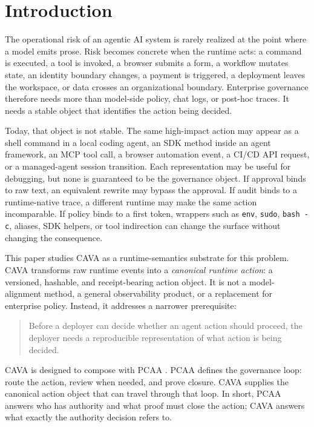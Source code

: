 \documentclass[11pt]{article}
\begin{document}
\section{Introduction}

The operational risk of an agentic AI system is rarely realized at the point where a model emits prose. Risk becomes concrete when the runtime acts: a command is executed, a tool is invoked, a browser submits a form, a workflow mutates state, an identity boundary changes, a payment is triggered, a deployment leaves the workspace, or data crosses an organizational boundary. Enterprise governance therefore needs more than model-side policy, chat logs, or post-hoc traces. It needs a stable object that identifies the action being decided.

Today, that object is not stable. The same high-impact action may appear as a shell command in a local coding agent, an SDK method inside an agent framework, an MCP tool call, a browser automation event, a CI/CD API request, or a managed-agent session transition. Each representation may be useful for debugging, but none is guaranteed to be the governance object. If approval binds to raw text, an equivalent rewrite may bypass the approval. If audit binds to a runtime-native trace, a different runtime may make the same action incomparable. If policy binds to a first token, wrappers such as \texttt{env}, \texttt{sudo}, \texttt{bash -c}, aliases, SDK helpers, or tool indirection can change the surface without changing the consequence.

This paper studies CAVA as a runtime-semantics substrate for this problem. CAVA transforms raw runtime events into a \emph{canonical runtime action}: a versioned, hashable, and receipt-bearing action object. It is not a model-alignment method, a general observability product, or a replacement for enterprise policy. Instead, it addresses a narrower prerequisite:

\begin{quote}
Before a deployer can decide whether an agent action should proceed, the deployer needs a reproducible representation of what action is being decided.
\end{quote}

CAVA is designed to compose with PCAA \citep{pcaa2026}. PCAA defines the governance loop: route the action, review when needed, and prove closure. CAVA supplies the canonical action object that can travel through that loop. In short, PCAA answers who has authority and what proof must close the action; CAVA answers what exactly the authority decision refers to.
\end{document}
